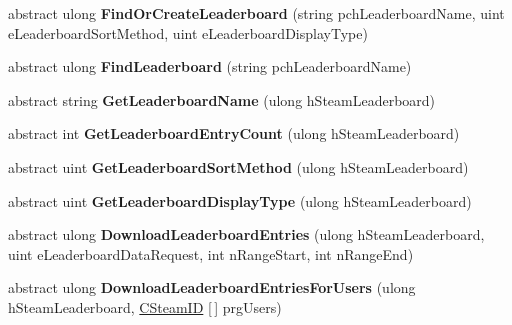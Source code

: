 \begin{DoxyCompactItemize}
abstract ulong {\bfseries Find\+Or\+Create\+Leaderboard} (string pch\+Leaderboard\+Name, uint e\+Leaderboard\+Sort\+Method, uint e\+Leaderboard\+Display\+Type)
\item 
\mbox{\label{class_valve_1_1_steamworks_1_1_i_steam_user_stats_a79df9183ba3695814b8bfd76cacc4e39}} 
abstract ulong {\bfseries Find\+Leaderboard} (string pch\+Leaderboard\+Name)
\item 
\mbox{\label{class_valve_1_1_steamworks_1_1_i_steam_user_stats_a6ba5b1fc93a4595a4e29d625ee11b542}} 
abstract string {\bfseries Get\+Leaderboard\+Name} (ulong h\+Steam\+Leaderboard)
\item 
\mbox{\label{class_valve_1_1_steamworks_1_1_i_steam_user_stats_a04f61c569ec5cd0d92797156eef4ece8}} 
abstract int {\bfseries Get\+Leaderboard\+Entry\+Count} (ulong h\+Steam\+Leaderboard)
\item 
\mbox{\label{class_valve_1_1_steamworks_1_1_i_steam_user_stats_a97650372ef3c5eedcc259a116020f748}} 
abstract uint {\bfseries Get\+Leaderboard\+Sort\+Method} (ulong h\+Steam\+Leaderboard)
\item 
\mbox{\label{class_valve_1_1_steamworks_1_1_i_steam_user_stats_a097b01325f1f36c2ce3f1a53b39a978a}} 
abstract uint {\bfseries Get\+Leaderboard\+Display\+Type} (ulong h\+Steam\+Leaderboard)
\item 
\mbox{\label{class_valve_1_1_steamworks_1_1_i_steam_user_stats_a266ba7aba2ffac0309c8e07690c11b6c}} 
abstract ulong {\bfseries Download\+Leaderboard\+Entries} (ulong h\+Steam\+Leaderboard, uint e\+Leaderboard\+Data\+Request, int n\+Range\+Start, int n\+Range\+End)
\item 
\mbox{\label{class_valve_1_1_steamworks_1_1_i_steam_user_stats_a769dde67a07bf043f099fe18adbfc80d}} 
abstract ulong {\bfseries Download\+Leaderboard\+Entries\+For\+Users} (ulong h\+Steam\+Leaderboard, \hyperlink{struct_valve_1_1_steamworks_1_1_c_steam_i_d}{C\+Steam\+ID} \mbox{[}$\,$\mbox{]} prg\+Users)

\end{DoxyCompactItemize}
